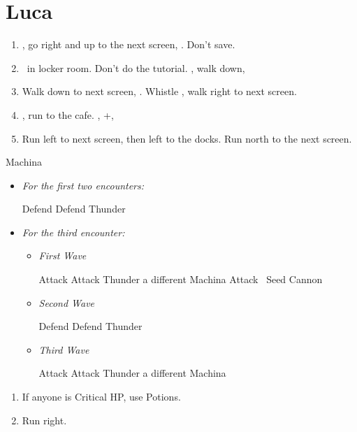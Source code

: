 \chapter{Luca}

\begin{enumerate}
	\item \sd, go right and up to the next screen, \cs[2:30]. Don't save.
	\item \sd\ in locker room. Don't do the tutorial. \sd, walk down, \sd
	\item Walk down to next screen, \sd. Whistle \cs[0:30], walk right to next screen.
	\item \sd, run to the cafe. \sd, \skippablefmv+\cs[1:20], \sd
	\item Run left to next screen, then left to the docks. Run north to the next screen.
\end{enumerate}
\begin{battle}{Machina}
	\begin{itemize}
	\item \textit{For the first two encounters:}
	\begin{itemize}
		\tidusf Defend
		\kimahrif Defend
		\luluf Thunder
	\end{itemize}
	\item \textit{For the third encounter:}
	\begin{itemize}
		\item \textit{First Wave}
		\begin{itemize}
			\tidusf Attack
			\kimahrif Attack
			\luluf Thunder a different Machina
			\tidusf Attack
			\kimahrif \od\ Seed Cannon
		\end{itemize}
		\item \textit{Second Wave}
		\begin{itemize}
			\tidusf Defend
			\kimahrif Defend
			\luluf Thunder
		\end{itemize}
		\item \textit{Third Wave}
		\begin{itemize}
			\tidusf Attack
			\kimahrif Attack
			\luluf Thunder a different Machina
		\end{itemize}
	\end{itemize}
	\end{itemize}
\end{battle}
\begin{enumerate}[resume]
	\item If anyone is Critical HP, use Potions.
	\item Run right.
\end{enumerate}
